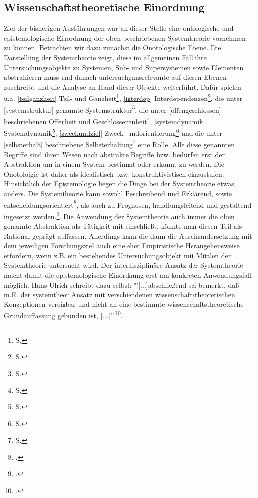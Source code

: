 \documentclass[a4paper,12pt]{article}
\begin{document}
\subsection{Wissenschaftstheoretische Einordnung}\label{einordnung}
Ziel der bisherigen Ausführungen war an dieser Stelle eine ontologische und epistemologische Einordnung der oben beschriebenen Systemtheorie vornehmen zu können. Betrachten wir dazu zunächst die Onotologische Ebene. Die Darstellung der Systemtheorie zeigt, diese im allgemeinen Fall ihre Untersuchungsobjekte zu Systemen, Sub- und Supersystemen sowie Elementen abstrahieren muss und danach untersuchgunsrelevante auf diesen Ebenen zuschreibt und die Analyse an Hand dieser Objekte weiterführt. Dafür spielen u.a. \ref{teilganzheit} Teil- und Ganzheit\footnote{S. \pageref{teilganzheit}}, \ref{interdep} Interdependenzen\footnote{S. \pageref{interdep}}, die unter \ref{systemstruktur} genannte Systemstruktur\footnote{S. \pageref{systemstruktur}}, die unter \ref{offengeschlossen} beschriebenen Offenheit und Geschlossenenheit\footnote{S. \pageref{offengeschlossen}}, \ref{systemdynamik} Systemdynamik\footnote{S. \pageref{systemdynamik}}, \ref{zweckundziel} Zweck- undorientierung\footnote{S. \pageref{zweckundziel}} und die unter \ref{selbsterhalt} beschriebene Selbsterhaltung\footnote{S. \pageref{selbsterhalt}} eine Rolle. Alle diese genannten Begriffe sind ihren Wesen nach abstrakte Begriffe bzw. bedürfen erst der Abstraktion um in einem System bestimmt oder erkannt zu werden. Die Onotoloigie ist daher als idealistisch bzw. konstruktivistisch einzustufen.\\
Hinsichtlich der Epistemologie liegen die Dinge bei der Systemtheorie etwas anders. Die Systemtheorie kann sowohl Beschreibend und Erklärend, sowie entscheidungsorientiert\footcite[S. 45]{Ulrich2016}, als auch zu Prognosen, handlungsleitend und gestaltend ingesetzt werden.\footcite[S. 47]{Ulrich2016}. Die Anwendung der Systemtheorie auch immer die oben genannte Abstraktion als Tätigkeit mit einschließt, könnte man diesen Teil als Rational geprägt auffassen. Allerdings kann die dann die Auseinandersetzung mit dem jeweiligen Forschungsziel auch eine eher Empiristische Herangehensweise erfordern, wenn z.B. ein bestehendes Untersuchungsobjekt mit Mittlen der Systemtheorie untersucht wird. Der interdisziplinäre Ansatz der Systemtheorie macht damit die epistemologische Einordnung erst am konkreten Anwendungsfall möglich. Hans Ulrich schreibt dazu selbst: "'[...]abschließend sei bemerkt, daß m.E. der systemtheor Ansatz mit verschiendenen wissenschaftstheoretischen Konzeptionen vereinbar und nicht an eine bestimmte wissenschaftstheoretische Grundauffassung gebunden ist, [...]"'\footcite[S. 48]{Ulrich2016}.
\end{document}
